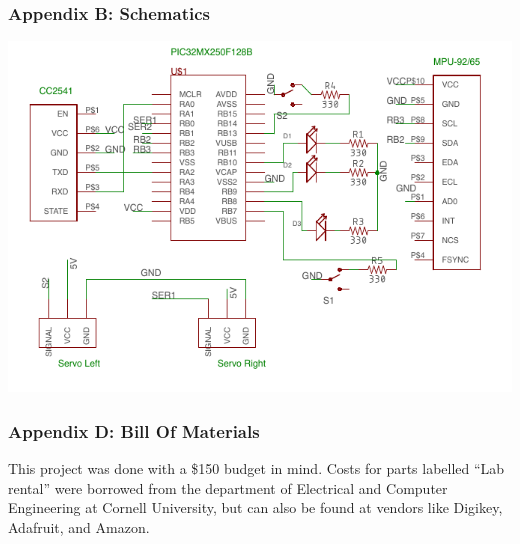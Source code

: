 \documentclass[]{article}
\begin{document}
\hypertarget{appendix-c-schematics}{%
\subsubsection{Appendix B: Schematics}\label{appendix-c-schematics}}

\includegraphics{schematic.png}

\hypertarget{appendix-d-bill-of-materials}{%
\subsubsection{Appendix D: Bill Of
Materials}\label{appendix-d-bill-of-materials}}

This project was done with a \$150 budget in mind. Costs for parts labelled ``Lab rental'' were borrowed from the department of Electrical and Computer Engineering at Cornell University, but can also be found at vendors like Digikey, Adafruit, and Amazon.
\end{document}
